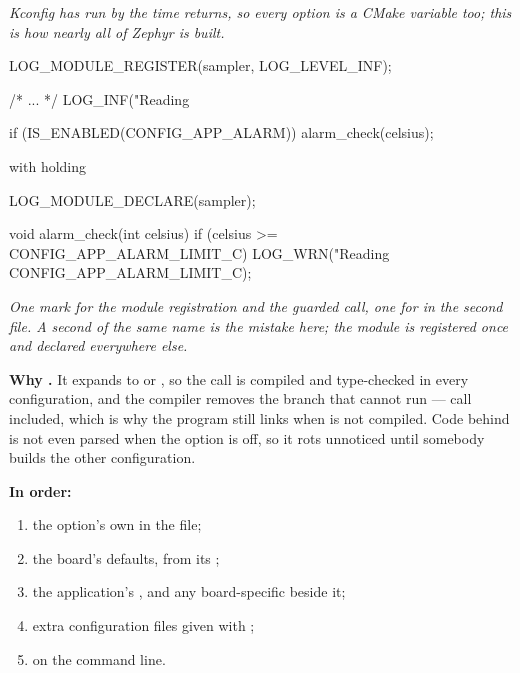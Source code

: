 \noindent{}

\noindent\emph{Kconfig has run by the time  returns, so every option is a
CMake variable too; this is how nearly all of Zephyr is built.}

\begin{ccode}
LOG_MODULE_REGISTER(sampler, LOG_LEVEL_INF);

/* ... */
	LOG_INF("Reading %

	if (IS_ENABLED(CONFIG_APP_ALARM)) {
		alarm_check(celsius);
	}
\end{ccode}

\noindent with  holding

\begin{ccode}
LOG_MODULE_DECLARE(sampler);

void alarm_check(int celsius)
{
	if (celsius >= CONFIG_APP_ALARM_LIMIT_C) {
		LOG_WRN("Reading %
			CONFIG_APP_ALARM_LIMIT_C);
	}
}
\end{ccode}

\noindent{}

\noindent\emph{One mark for the module registration and the guarded call, one for
 in the second file. A second  of the same name
is the mistake here; the module is registered once and declared everywhere else.}

\textbf{Why .} It expands to  or , so the call is compiled and
type-checked in every configuration, and the compiler removes the branch that cannot run --- call
included, which is why the program still links when  is not compiled. Code behind
 is not even parsed when the option is off, so it rots unnoticed until somebody builds
the other configuration. 

\textbf{In order:}
\begin{enumerate}
  \item the option's own  in the  file;
  \item the board's defaults, from its ;
  \item the application's , and any board-specific  beside it;
  \item extra configuration files given with ;
  \item {} on the  command line.
\end{enumerate}


